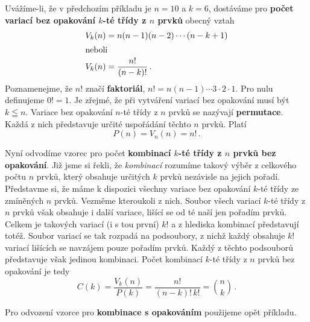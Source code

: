       Uvážíme-li, že v předchozím příkladu je \(n = 10\) a \(k = 6\), dostáváme pro \textbf{počet 
      variací bez opakování \(k\)-té třídy z \(n\) prvků} obecný vztah
      \begin{align}
        V_k(n) &= n(n-1)(n-2)\cdots(n-k+1)  \nonumber \\
        \shortintertext{neboli}
        V_k(n) &= \frac{n!}{(n-k)!}\, .    \label{mai:eq008}
      \end{align}
      Poznamenejme, že \(n!\) značí \textbf{faktoriál}, \(n! = n(n - 1)\cdots 3 \cdot 2 \cdot 1\). 
      Pro nulu definujeme \(0! = 1\). Je zřejmé, že při vytváření variací bez opakování musí být 
      \(k\leqq n\). Variace bez opakování \(n\)-té třídy z \(n\) prvků se nazývají 
      \textbf{permutace}. Každá z nich představuje určité uspořádání těchto \(n\) prvků. Platí
      \begin{equation}\label{mai:eq009}
        \boxed{P(n) = V_n(n) = n!}\, .
      \end{equation}
      
      Nyní odvodíme vzorec pro počet \textbf{kombinací \(k\)-té třídy z \(n\) prvků bez opakování}. 
      Již jsme si řekli, že \emph{kombinací} rozumíme takový výběr z celkového počtu \(n\) prvků, 
      který obsahuje určitých \(k\) prvků nezávisle na jejich pořadí. Představme si, že máme k 
      dispozici všechny variace bez opakování \(k\)-té třídy ze zmíněných \(n\) prvků. Vezměme 
      kteroukoli z nich. Soubor všech variací \(k\)-té třídy z \(n\) prvků však obsahuje i další 
      variace, lišící se od té naší jen pořadím prvků. Celkem je takových variací (i s tou první) 
      \(k!\) a z hlediska kombinací představují totéž. Soubor variací se tak rozpadá na podsoubory, 
      z nichž každý obsahuje \(k!\) variací lišících se navzájem pouze pořadím prvků. Každý z 
      těchto podsouborů představuje však jedinou kombinaci. Počet kombinací \(k\)-té třídy z \(n\) 
      prvků bez opakování je tedy
      \begin{equation}\label{mai:eq010}
        \boxed{C(k) = \frac{V_k(n)}{P(k)} = \frac{n!}{(n-k)!\,k!} = \binom{n}{k}}\, .
      \end{equation}
      
      Pro odvození vzorce pro \textbf{kombinace s opakováním} použijeme opět příkladu.
      
      
      
      
